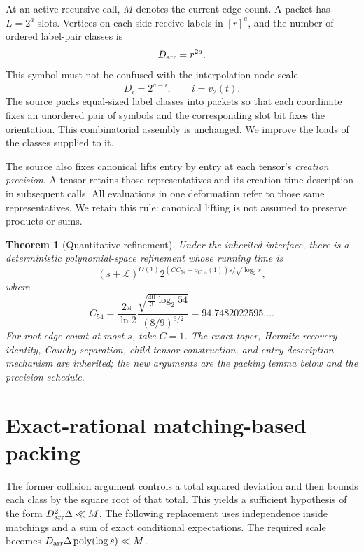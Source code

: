 \documentclass[11pt]{article}
\newtheorem{theorem}{Theorem}[section]
\theoremstyle{remark}\newtheorem{remark}[theorem]{Remark}
\newcommand{\LL}{\mathcal L}
\newcommand{\Darr}{D_{\rm arr}}
\newcommand{\poly}{\operatorname{poly}}
\newcommand{\vTwo}{v_2}
\begin{document}
At an active recursive call, \(M\) denotes the current edge count. A packet has \(L=2^a\) slots. Vertices on each side receive labels in \([r]^a\), and the number of ordered label-pair classes is
\[
 \Darr=r^{2a}.
\]
This symbol must not be confused with the interpolation-node scale
\[
 D_i=2^{a-i},\qquad i=\vTwo(t).
\]
The source packs equal-sized label classes into packets so that each coordinate fixes an unordered pair of symbols and the corresponding slot bit fixes the orientation. This combinatorial assembly is unchanged. We improve the loads of the classes supplied to it.

The source also fixes canonical lifts entry by entry at each tensor's \emph{creation precision}. A tensor retains those representatives and its creation-time description in subsequent calls. All evaluations in one deformation refer to those same representatives. We retain this rule: canonical lifting is not assumed to preserve products or sums.

\begin{theorem}[Quantitative refinement]\label{thm:main}
Under the inherited interface, there is a deterministic polynomial-space refinement whose running time is
\[
 (s+\LL)^{O(1)}
 2^{(C C_{54}+o_{C,A}(1))s/\sqrt{\log_2 s}},
\]
where
\begin{equation}
 C_{54}=\frac{2\pi}{\ln2}
 \frac{\sqrt{\frac{40}{3}\log_2 54}}{(8/9)^{3/2}}
 =94.7482022595\ldots .\label{eq:c54}
\end{equation}
For root edge count at most \(s\), take \(C=1\). The exact taper, Hermite recovery identity, Cauchy separation, child-tensor construction, and entry-description mechanism are inherited; the new arguments are the packing lemma below and the precision schedule.
\end{theorem}

\section{Exact-rational matching-based packing}
\label{sec:packing}
The former collision argument controls a total squared deviation and then bounds each class by the square root of that total. This yields a sufficient hypothesis of the form \(\Darr^2\Delta\ll M\). The following replacement uses independence inside matchings and a sum of exact conditional expectations. The required scale becomes \(\Darr\Delta\poly(\log s)\ll M\).
\end{document}
